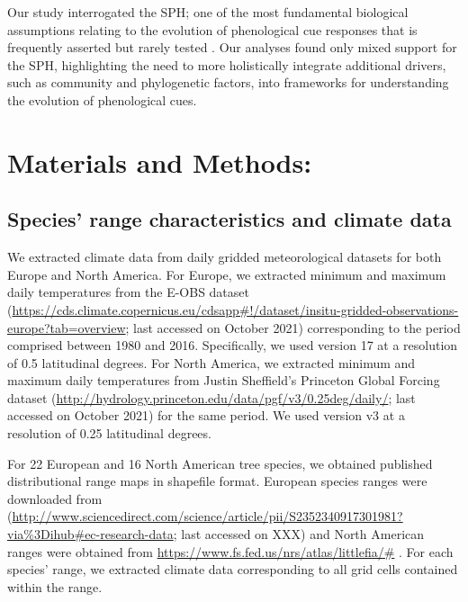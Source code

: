 \documentclass[12pt]{article}
\begin{document}
Our study interrogated the SPH; one of the most fundamental biological assumptions relating to the evolution of phenological cue responses that is frequently asserted but rarely tested \citep[but see][]{Zohner:2017aa}. Our analyses found only mixed support for the SPH, highlighting the need to more holistically integrate additional drivers, such as community and phylogenetic factors, into frameworks for understanding the evolution of phenological cues.



\section*{Materials and Methods:}
\subsection*{Species' range characteristics and climate data}
We extracted climate data from daily gridded meteorological datasets for both Europe and North America. For Europe, we extracted minimum and maximum daily temperatures from the E-OBS dataset (\url{https://cds.climate.copernicus.eu/cdsapp#!/dataset/insitu-gridded-observations-europe?tab=overview}; last accessed on October 2021) corresponding to the period comprised between 1980 and 2016. Specifically, we used version 17 at a resolution of 0.5 latitudinal degrees. For North America, we extracted minimum and maximum daily temperatures from Justin Sheffield's Princeton Global Forcing dataset (\url{http://hydrology.princeton.edu/data/pgf/v3/0.25deg/daily/}; last accessed on October 2021) for the same period. We used version v3 at a resolution of 0.25 latitudinal degrees. 

For 22 European and 16 North American tree species, we obtained published distributional range maps in shapefile format. European species ranges were downloaded from (\url{http://www.sciencedirect.com/science/article/pii/S2352340917301981?via\%3Dihub#ec-research-data}; last accessed on XXX) \citep{Caudullo2017} and North American ranges were obtained from \url{https://www.fs.fed.us/nrs/atlas/littlefia/#} \citep{Prasad2003}. For each species' range, we extracted climate data corresponding to all grid cells contained within the range.
\end{document}
